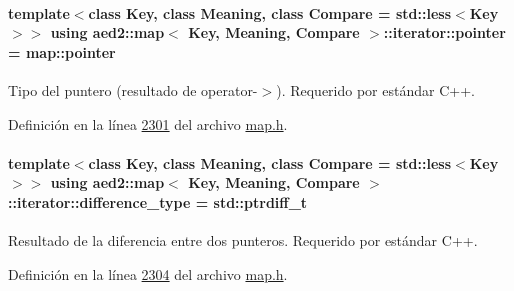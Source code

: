 \hypertarget{classaed2_1_1map_1_1iterator_a52ea7bdbf1dc6b252aec76633564bdf5_a52ea7bdbf1dc6b252aec76633564bdf5}{
\paragraph[{pointer}]{\setlength{\rightskip}{0pt plus 5cm}template$<$class Key, class Meaning, class Compare = std\-::less$<$\-Key$>$$>$ using {\bf aed2\-::map}$<$ Key, Meaning, Compare $>$\-::{\bf iterator\-::pointer} =  {\bf map\-::pointer}}}\label{classaed2_1_1map_1_1iterator_a52ea7bdbf1dc6b252aec76633564bdf5_a52ea7bdbf1dc6b252aec76633564bdf5}


Tipo del puntero (resultado de operator-\/$>$). Requerido por estándar C++. 



Definición en la línea \hyperlink{map_8h_source_l02301}{2301} del archivo \hyperlink{map_8h_source}{map.\-h}.

\hypertarget{classaed2_1_1map_1_1iterator_a803083681db1f62aed5138194abc1f06_a803083681db1f62aed5138194abc1f06}{
\paragraph[{difference\-\_\-type}]{\setlength{\rightskip}{0pt plus 5cm}template$<$class Key, class Meaning, class Compare = std\-::less$<$\-Key$>$$>$ using {\bf aed2\-::map}$<$ Key, Meaning, Compare $>$\-::{\bf iterator\-::difference\-\_\-type} =  std\-::ptrdiff\-\_\-t}}\label{classaed2_1_1map_1_1iterator_a803083681db1f62aed5138194abc1f06_a803083681db1f62aed5138194abc1f06}


Resultado de la diferencia entre dos punteros. Requerido por estándar C++. 



Definición en la línea \hyperlink{map_8h_source_l02304}{2304} del archivo \hyperlink{map_8h_source}{map.\-h}.




